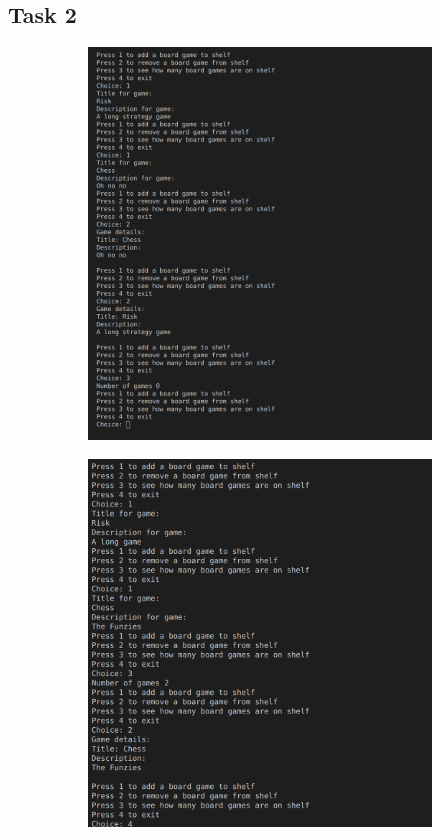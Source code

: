 \documentclass[11pt]{article}
\begin{document}
	\subsection{Task 2}
	\begin{figure}[H]
		\begin{subfigure}{.5\linewidth}
			\centering
			\includegraphics[scale=0.5]{Task2p1}
		\end{subfigure}
		\begin{subfigure}{.5\linewidth}
			\centering
			\includegraphics[scale=0.6]{Task2p2}

\end{subfigure}
\end{figure}
\end{document}
